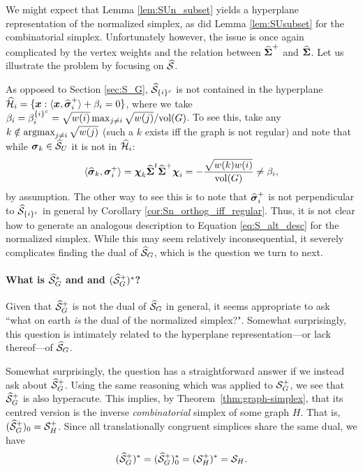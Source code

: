 We might expect that Lemma \ref{lem:SUn_subset} yields a hyperplane representation of the normalized simplex, as did Lemma \ref{lem:SUsubset} for the combinatorial simplex. Unfortunately however, the issue is once again complicated by the vertex weights and the relation between $\widehat{\boldsymbol{\Sigma}}^+$ and $\widehat{\boldsymbol{\Sigma}}$. Let us illustrate the problem by focusing on $\widehat{\mathcal{S}}$. 

As opposed to Section \ref{sec:S_G}, $\widehat{\mathcal{S}}_{\{i\}^c} $ is not contained in the hyperplane $\widehat{\mathcal{H}}_i = \{\vb*{x}: \langle \vb*{x},\widehat{\vb*{\sigma}}_i^+\rangle + \beta_i=0\}$, where we take $\beta_i = \beta_i^{\{i\}^c} = \sqrt{w(i)}\max_{j\neq i}\sqrt{w(j)} / \textnormal{vol}(G)$. To see this, take any $k\notin \operatorname*{\textnormal{argmax}}_{j\neq i} \sqrt{w(j)}$ (such a $k$ exists iff the graph is not regular) and note that while $\vb*{\sigma}_k\in\widehat{\mathcal{S}}_U$ it is not in $\widehat{\mathcal{H}}_i$: 
\[\langle \widehat{\vb*{\sigma}}_k,\vb*{\sigma}_i^+\rangle = \boldsymbol{\chi}_k\widehat{\boldsymbol{\Sigma}}^t\widehat{\boldsymbol{\Sigma}}^+\boldsymbol{\chi}_i = -\frac{\sqrt{w(k)w(i)}}{\textnormal{vol}(G)}\neq \beta_i,\]
by assumption. The other way to see this is to note that $\widehat{\vb*{\sigma}}_i^+$ is not perpendicular to $\widehat{\mathcal{S}}_{\{i\}^c}$ in general by Corollary \ref{cor:Sn_orthog_iff_regular}. Thus, it is not  clear how to generate an analogous description to Equation \eqref{eq:S_alt_desc} for the normalized simplex. While this may seem relatively inconsequential, it severely complicates finding the dual of $\widehat{\mathcal{S}}_G$, which is the question we turn to next. 

\paragraph{What is $\widehat{\mathcal{S}}_G^*$ and and $(\widehat{\mathcal{S}}_G^+)^*$?} 
Given that $\widehat{\mathcal{S}}_G^+$ is not the dual of $\widehat{\mathcal{S}}_G$ in general, it  seems appropriate  to  ask ``what on  earth \emph{is} the dual of the normalized simplex?". Somewhat surprisingly, this question is intimately related to the hyperplane representation---or lack thereof---of $\widehat{\mathcal{S}}_G$. 

Somewhat surprisingly, the question has a straightforward answer if we instead  ask about  $\widehat{\mathcal{S}}_G^+$. Using the same reasoning which was applied to $\mathcal{S}_G^+$, we see that $\widehat{\mathcal{S}}_G^+$  is also hyperacute.
This implies, by Theorem~\ref{thm:graph-simplex}, that its centred version is the inverse \emph{combinatorial} simplex of some graph $H$. That is,  $(\widehat{\mathcal{S}}_G^+)_0 = \mathcal{S}_H^+$. Since all translationally congruent simplices  share the same dual, we have 
\begin{equation*}
(\widehat{\mathcal{S}}_G^+)^* = (\widehat{\mathcal{S}}_G^+)^*_0 = (\mathcal{S}_H^+)^* = \mathcal{S}_H.
\end{equation*}

